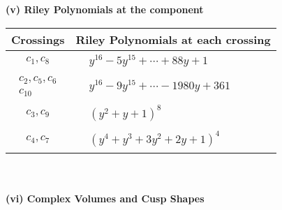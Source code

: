 \documentclass[1p]{elsarticle_modified}
\theoremstyle{definition}
\begin{document}
\newpage\renewcommand{\arraystretch}{1}
\flushleft \textbf{(v) Riley Polynomials at the component}\newline \\
\begin{tabular}{m{50pt}|m{274pt}}
Crossings & \hspace{64pt}Riley Polynomials at each crossing \\
\hline $$\begin{aligned}c_{1},c_{8}\end{aligned}$$&$\begin{aligned}
&y^{16}-5 y^{15}+\cdots+88 y+1
\end{aligned}$\\
\hline $$\begin{aligned}c_{2},c_{5},c_{6}\\c_{10}\end{aligned}$$&$\begin{aligned}
&y^{16}-9 y^{15}+\cdots-1980 y+361
\end{aligned}$\\
\hline $$\begin{aligned}c_{3},c_{9}\end{aligned}$$&$\begin{aligned}
&(y^2+y+1)^8
\end{aligned}$\\
\hline $$\begin{aligned}c_{4},c_{7}\end{aligned}$$&$\begin{aligned}
&(y^4+y^3+3 y^2+2 y+1)^4
\end{aligned}$\\
\hline
\end{tabular}\\~\\
\newpage\flushleft \textbf{(vi) Complex Volumes and Cusp Shapes}
\end{document}
